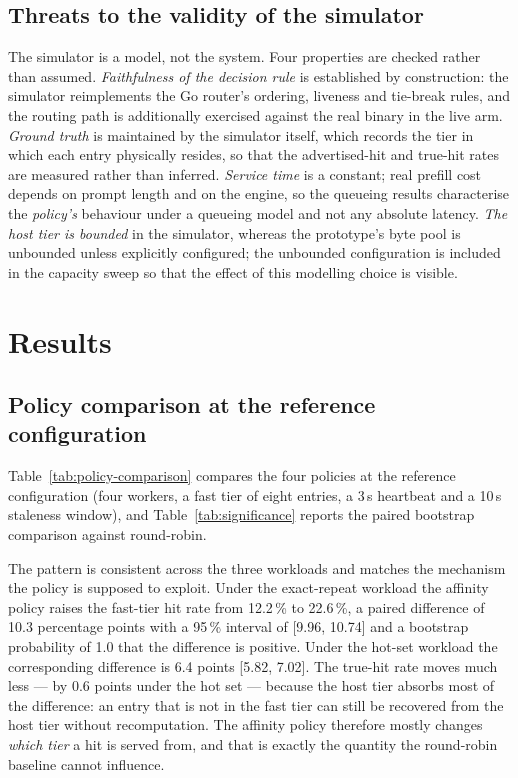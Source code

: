 \documentclass[10pt,twocolumn]{article}
\begin{document}
\subsection{Threats to the validity of the simulator}

The simulator is a model, not the system. Four properties are checked rather
than assumed. \emph{Faithfulness of the decision rule} is established by
construction: the simulator reimplements the Go router's ordering, liveness
and tie-break rules, and the routing path is additionally exercised against
the real binary in the live arm. \emph{Ground truth} is maintained by the
simulator itself, which records the tier in which each entry physically
resides, so that the advertised-hit and true-hit rates are measured rather
than inferred. \emph{Service time} is a constant; real prefill cost depends
on prompt length and on the engine, so the queueing results characterise the
\emph{policy's} behaviour under a queueing model and not any absolute
latency. \emph{The host tier is bounded} in the simulator, whereas the
prototype's byte pool is unbounded unless explicitly configured; the
unbounded configuration is included in the capacity sweep so that the effect
of this modelling choice is visible.

\section{Results}
\label{sec:results}

\subsection{Policy comparison at the reference configuration}

Table~\ref{tab:policy-comparison} compares the four policies at the
reference configuration (four workers, a fast tier of eight entries, a 3\,s
heartbeat and a 10\,s staleness window), and
Table~\ref{tab:significance} reports the paired bootstrap comparison against
round-robin.





The pattern is consistent across the three workloads and matches the
mechanism the policy is supposed to exploit. Under the exact-repeat workload
the affinity policy raises the fast-tier hit rate from 12.2\,\% to 22.6\,\%,
a paired difference of 10.3 percentage points with a 95\,\% interval of
[9.96, 10.74] and a bootstrap probability of 1.0 that the difference is
positive. Under the hot-set workload the corresponding difference is 6.4
points [5.82, 7.02]. The true-hit rate moves much less --- by 0.6 points
under the hot set --- because the host tier absorbs most of the difference:
an entry that is not in the fast tier can still be recovered from the host
tier without recomputation. The affinity policy therefore mostly changes
\emph{which tier} a hit is served from, and that is exactly the quantity the
round-robin baseline cannot influence.
\end{document}
